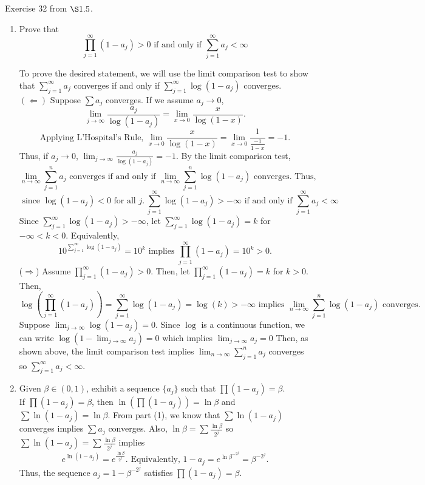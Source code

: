 Exercise 32 from $\S 1.5$. 
\begin{enumerate}
\item 	Prove that 
\[ \prod_{j=1}^\infty(1 - a_j)> 0 \text{ if and only if } \sum_{j=1}^\infty a_j < \infty 
\]
\begin{pf}
	To prove the desired statement, we will use the limit comparison test to  show that $\sum_{j=1}^\infty a_j$ converges if and only if $\sum_{j=1}^\infty \log(1-a_j)$ converges. \\
	$(\Leftarrow)$ Suppose $\sum a_j$ converges. If we assume $a_j\rightarrow 0$, 
	\[
	\lim_{j\rightarrow \infty}\frac{a_j}{\log(1-a_j)}= \lim_{x \rightarrow 0}\frac{x}{\log(1-x)}. 
	\]
	 \[
\text{Applying L’Hospital’s Rule, } \lim_{x \rightarrow 0}\frac{x}{\log(1-x)}=\lim_{x \rightarrow 0}\frac{1}{\frac{-1}{1-x}}=-1.
	\]
	Thus, if $a_j\rightarrow 0$, $\lim_{j\rightarrow \infty}\frac{a_j}{\log(1-a_j)}=-1$. By the limit comparison test, 
	\[
	\lim_{n\rightarrow \infty}\sum_{j=1}^n a_j \text{ converges if and only if } \lim_{n\rightarrow \infty}\sum_{j=1}^n \log(1-a_j) \text{ converges. Thus, }
	\]
	\[ \text{ since } \log(1-a_j)<0 \text{ for all } j. \  \sum_{j=1}^\infty \log(1-a_j)> -\infty \text{ if and only if } \sum_{j=1}^\infty a_j < \infty 
\]
Since $\sum_{j=1}^\infty \log(1-a_j)> -\infty $, let $\sum_{j=1}^\infty \log(1-a_j)=k$ for $-\infty < k < 0$. Equivalently, 
\[
10^{\sum_{j=1}^\infty \log(1-a_j)}=10^k \text{ implies }  \prod_{j=1}^\infty(1 - a_j)=10^k>0.
\]
($\Rightarrow$) Assume $\prod_{j=1}^\infty(1 - a_j)> 0 $. Then, let $\prod_{j=1}^\infty(1 - a_j)=k$ for $k>0$. Then,
\[
\log\left(\prod_{j=1}^\infty(1 - a_j)\right)=\sum_{j=1}^\infty \log(1-a_j)=\log(k)>-\infty \text{ implies } \lim_{n\rightarrow \infty}\sum_{j=1}^n \log(1-a_j) \text{ converges. }
\]
Suppose $ \lim_{j\rightarrow \infty} \log(1-a_j) =0$. Since $\log$ is a continuous function, we can write $ \log(1-\lim_{j\rightarrow \infty} a_j)=0$ which implies $\lim_{j\rightarrow \infty} a_j=0$ Then, as shown above, the limit comparison test implies $\lim_{n\rightarrow \infty}\sum_{j=1}^n a_j$ converges so $\sum_{j=1}^\infty a_j< \infty$.
\end{pf}

\item Given $\beta \in (0,1)$, exhibit a sequence $\{a_j\}$ such that $\prod(1-a_j)=\beta$.  \\
If $\prod(1-a_j)=\beta$, then $\ln\left(\prod(1-a_j)\right)=\ln\beta$ and $\sum\ln(1-a_j)=\ln\beta$. From part (1), we know that $\sum\ln(1-a_j)$ converges implies $\sum a_j$ converges. Also, $\ln\beta= \sum \frac{\ln \beta}{2^j}$ so $\sum\ln(1-a_j)=\sum \frac{\ln \beta}{2^j}$ implies
\[
e^{\ln(1-a_j)}=e^{\frac{\ln \beta}{2^j}}. \text{ Equivalently, } 1-a_j=e^{\ln \beta^{-2^j}}=\beta^{-2^j}.
\] 
Thus, the sequence $a_j=1-\beta^{-2^j}$ satisfies $\prod(1-a_j)=\beta$.
\end{enumerate}
